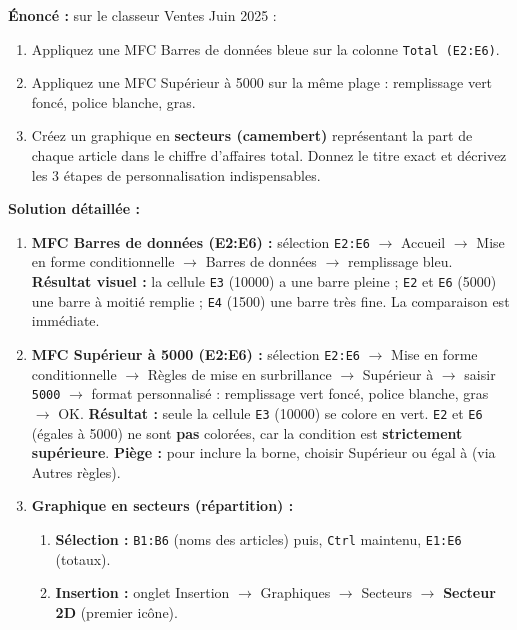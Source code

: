 \documentclass[11pt]{article}
\begin{document}
\begin{exoresolu}
\textbf{Énoncé :} sur le classeur \og{}Ventes Juin 2025\fg{} :
\begin{enumerate}
    \item Appliquez une MFC \og{}Barres de données\fg{} bleue sur la colonne \texttt{Total (E2:E6)}.
    \item Appliquez une MFC \og{}Supérieur à 5000\fg{} sur la même plage : remplissage vert foncé, police blanche, gras.
    \item Créez un graphique en \textbf{secteurs (camembert)} représentant la part de chaque article dans le chiffre d'affaires total. Donnez le titre exact et décrivez les 3 étapes de personnalisation indispensables.
\end{enumerate}
\tcblower
\textbf{Solution détaillée :}
\begin{enumerate}
    \item \textbf{MFC Barres de données (E2:E6) :} sélection \texttt{E2:E6} $\rightarrow$ Accueil $\rightarrow$ Mise en forme conditionnelle $\rightarrow$ Barres de données $\rightarrow$ remplissage bleu.
    \textbf{Résultat visuel :} la cellule \texttt{E3} (10000) a une barre pleine ; \texttt{E2} et \texttt{E6} (5000) une barre à moitié remplie ; \texttt{E4} (1500) une barre très fine. La comparaison est immédiate.
    \item \textbf{MFC \og{}Supérieur à 5000\fg{} (E2:E6) :} sélection \texttt{E2:E6} $\rightarrow$ Mise en forme conditionnelle $\rightarrow$ Règles de mise en surbrillance $\rightarrow$ Supérieur à $\rightarrow$ saisir \texttt{5000} $\rightarrow$ format personnalisé : remplissage vert foncé, police blanche, gras $\rightarrow$ OK.
    \textbf{Résultat :} seule la cellule \texttt{E3} (10000) se colore en vert. \texttt{E2} et \texttt{E6} (égales à 5000) ne sont \textbf{pas} colorées, car la condition est \textbf{strictement supérieure}. \textbf{Piège :} pour inclure la borne, choisir \og{}Supérieur ou égal à\fg{} (via \og{}Autres règles\fg{}).
    \item \textbf{Graphique en secteurs (répartition) :}
    \begin{enumerate}
        \item \textbf{Sélection :} \texttt{B1:B6} (noms des articles) puis, \texttt{Ctrl} maintenu, \texttt{E1:E6} (totaux).
        \item \textbf{Insertion :} onglet Insertion $\rightarrow$ Graphiques $\rightarrow$ Secteurs $\rightarrow$ \textbf{Secteur 2D} (premier icône).

\end{enumerate}
\end{enumerate}
\end{exoresolu}
\end{document}
